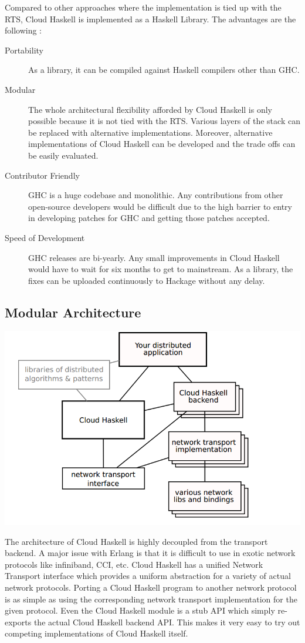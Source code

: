 Compared to other approaches where the implementation is tied up with
the RTS, Cloud Haskell is implemented as a Haskell Library.
The advantages are the following :
\begin{description}
\item[Portability] As a library, it can be compiled against Haskell compilers other than
GHC.
\item[Modular] The whole architectural flexibility afforded by Cloud Haskell is
  only possible because it is not tied with the RTS. Various layers of
  the stack can be replaced with alternative
  implementations. Moreover, alternative implementations of Cloud
  Haskell can be developed and the trade offs can be
  easily evaluated.
\item[Contributor Friendly] GHC is a huge codebase and monolithic. Any
  contributions from other open-source developers would be difficult
  due to the high barrier to entry in developing patches for GHC and
  getting those patches accepted.
\item[Speed of Development] GHC releases are bi-yearly. Any small
  improvements in Cloud Haskell would have to wait for six months to
  get to mainstream. As a library, the fixes can be uploaded
  continuously to Hackage without any delay.
\end{description}

\subsection{Modular Architecture}

\includegraphics[scale=0.5]{design}

The architecture of Cloud Haskell is highly decoupled from the
transport backend. A major issue with Erlang is that it is difficult
to use in exotic network protocols like infiniband, CCI, etc. Cloud
Haskell has a unified Network Transport interface which provides a
uniform abstraction for a variety of actual network protocols. Porting
a Cloud Haskell program to another network protocol is as simple as
using the corresponding network transport implementation for the given
protocol.  Even the Cloud Haskell module is a stub API which simply
re-exports the actual Cloud Haskell backend API. This makes it very
easy to try out competing implementations of Cloud Haskell itself.

